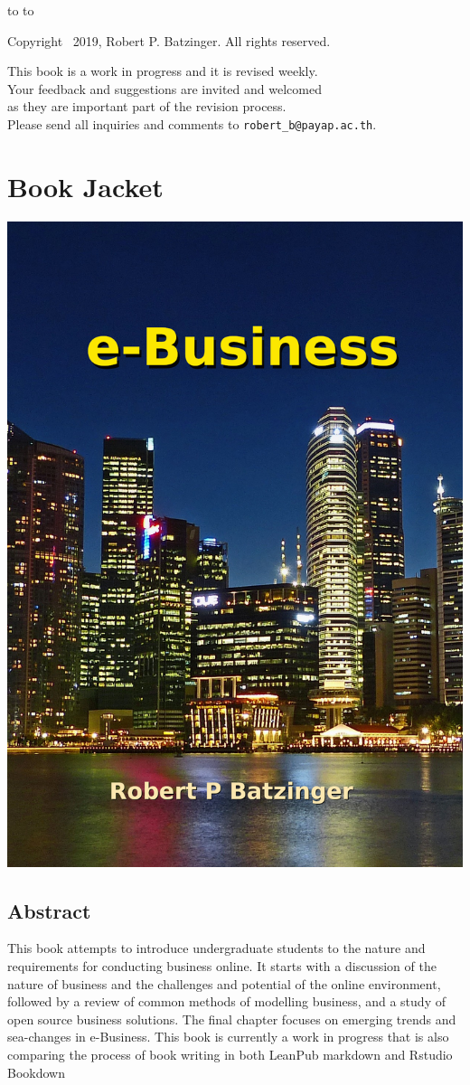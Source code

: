 \documentclass[]{book}
\begin{document}
\vfill
\vfill
\hbox to 
\medskip
\hbox to 
\vfill
\null
\newpage
\thispagestyle{empty}
\null
\vfill
\begin{center}
\noindent  Copyright \textcopyright\ 2019, Robert P. Batzinger. All rights reserved.\parfillskip=0pt\par
\vskip 0.5in
{\narrower\narrower
\noindent This book is a work in progress and it is revised weekly.\\
Your feedback and suggestions are invited and welcomed\\
as they are important part of the revision process.\\
Please send all inquiries and comments to \verb|robert_b@payap.ac.th|.\par}
\end{center}
\vfill
\vfill
\null
\newpage
\setcounter{page}{-1}

{
\setcounter{tocdepth}{1}
\tableofcontents
}
\hypertarget{book-jacket}{%
\chapter*{Book Jacket}\label{book-jacket}}

\includegraphics[width=0.25\linewidth]{images/cover11}

\hypertarget{abstract}{%
\section*{Abstract}\label{abstract}}

This book attempts to introduce undergraduate students to the nature and requirements for conducting business online. It starts with a discussion of the nature of business and the challenges and potential of the online environment, followed by a review of common methods of modelling business, and a study of open source business solutions.
The final chapter focuses on emerging trends and sea-changes in e-Business. This book is currently a work in progress that is also comparing the process of book writing in both LeanPub markdown and Rstudio Bookdown
\end{document}
